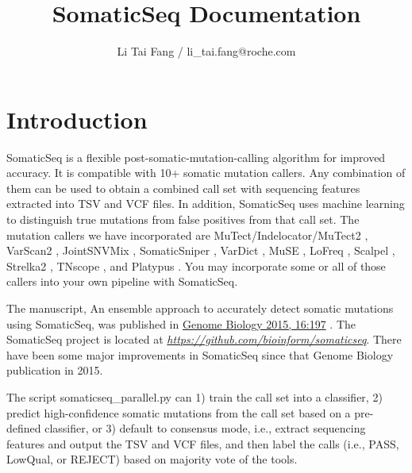 \documentclass[10pt,letterpaper]{article}
\author{Li Tai Fang / li\_tai.fang@roche.com}
\title{SomaticSeq Documentation}
\begin{document}
\maketitle



\begin{sloppypar}




\tableofcontents


\setlength{\parskip}{\baselineskip}


\section{Introduction} \label{Introduction}

SomaticSeq is a flexible post-somatic-mutation-calling algorithm for improved accuracy. It is compatible with 10+ somatic mutation callers. Any combination of them can be used to obtain a combined call set with sequencing features extracted into TSV and VCF files. In addition, SomaticSeq uses machine learning to distinguish true mutations from false positives from that call set. The mutation callers we have incorporated are MuTect/Indelocator/MuTect2 \cite{mutect}, VarScan2 \cite{varscan2}, JointSNVMix \cite{jointsnvmix2}, SomaticSniper \cite{somaticsniper}, VarDict \cite{vardict}, MuSE \cite{muse}, LoFreq \cite{lofreq}, Scalpel \cite{scalpel}, Strelka2 \cite{strelka2}, TNscope \cite{tnscope}, and Platypus \cite{platypus}. You may incorporate some or all of those callers into your own pipeline with SomaticSeq.


The manuscript, An ensemble approach to accurately detect somatic mutations using SomaticSeq, was published in \href{http://dx.doi.org/10.1186/s13059-015-0758-2}{Genome Biology 2015, 16:197} \cite{Fang_2015}. 
The SomaticSeq project is located at \href{https://github.com/bioinform/somaticseq}{\textit{https://github.com/bioinform/somaticseq}}. 
There have been some major improvements in SomaticSeq since that Genome Biology publication in 2015. 

The script somaticseq\_parallel.py can 1) train the call set into a classifier, 2) predict high-confidence somatic mutations from the call set based on a pre-defined classifier, or 3) default to consensus mode, i.e., extract sequencing features and output the TSV and VCF files, and then label the calls (i.e., PASS, LowQual, or REJECT) based on majority vote of the tools.




\end{sloppypar}
\end{document}
